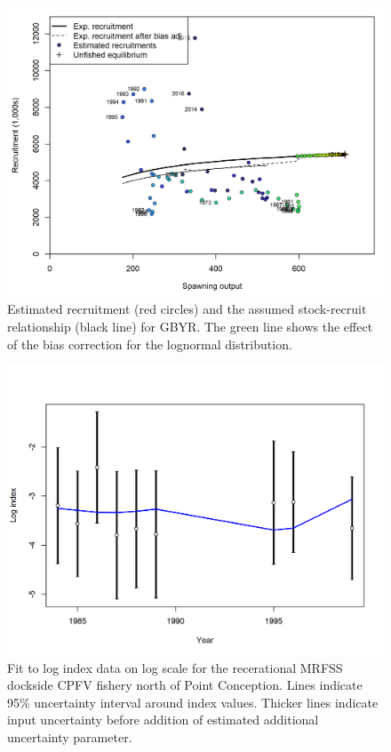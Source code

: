 \documentclass[12pt,]{article}
\begin{document}
\begin{figure}
\centering
\includegraphics{r4ss/plots_mod1/SR_curve2.png}
\caption{Estimated recruitment (red circles) and the assumed
stock-recruit relationship (black line) for GBYR. The green line shows
the effect of the bias correction for the lognormal distribution.
\label{fig:SR_curve2}}
\end{figure}

\FloatBarrier 

\begin{figure}
\centering
\includegraphics{r4ss/plots_mod1/index5_logcpuefit_RecDocksideNorth.png}
\caption{Fit to log index data on log scale for the recerational MRFSS
dockside CPFV fishery north of Point Conception. Lines indicate 95\%
uncertainty interval around index values. Thicker lines indicate input
uncertainty before addition of estimated additional uncertainty
parameter. \label{fig:index5_logcpuefit_RecDocksideNorth}}
\end{figure}
\end{document}
